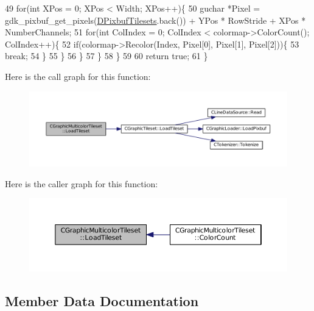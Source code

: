 \begin{DoxyCode}
49             \textcolor{keywordflow}{for}(\textcolor{keywordtype}{int} XPos = 0; XPos < Width; XPos++)\{
50                 guchar *Pixel = gdk\_pixbuf\_get\_pixels(\hyperlink{classCGraphicMulticolorTileset_a30809d113b0f314944425a3c8f21408c}{DPixbufTilesets}.back()) + YPos * 
      RowStride + XPos * NumberChannels;
51                 \textcolor{keywordflow}{for}(\textcolor{keywordtype}{int} ColIndex = 0; ColIndex < colormap->ColorCount(); ColIndex++)\{
52                     \textcolor{keywordflow}{if}(colormap->Recolor(Index, Pixel[0], Pixel[1], Pixel[2]))\{
53                         \textcolor{keywordflow}{break};   
54                     \}
55                 \}
56             \}
57         \}
58     \}
59     
60     \textcolor{keywordflow}{return} \textcolor{keyword}{true};
61 \}
\end{DoxyCode}
Here is the call graph for this function\+:\nopagebreak
\begin{figure}[H]
\begin{center}
\leavevmode
\includegraphics[width=350pt]{classCGraphicMulticolorTileset_a6ab975d5bc2ba0ed892de03bba9242cc_cgraph}
\end{center}
\end{figure}
Here is the caller graph for this function\+:\nopagebreak
\begin{figure}[H]
\begin{center}
\leavevmode
\includegraphics[width=350pt]{classCGraphicMulticolorTileset_a6ab975d5bc2ba0ed892de03bba9242cc_icgraph}
\end{center}
\end{figure}


\subsection{Member Data Documentation}
\hypertarget{classCGraphicMulticolorTileset_a30809d113b0f314944425a3c8f21408c}{}\label{classCGraphicMulticolorTileset_a30809d113b0f314944425a3c8f21408c} 
